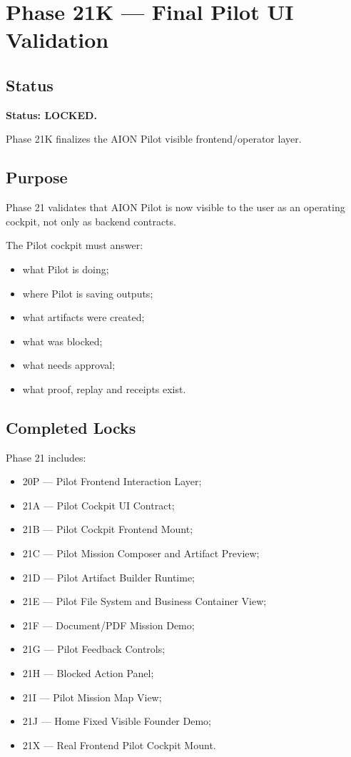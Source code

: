 \section{Phase 21K --- Final Pilot UI Validation}
\label{sec:aion-phase21k-final-pilot-ui-validation}

\subsection{Status}

\textbf{Status: LOCKED.}

Phase 21K finalizes the AION Pilot visible frontend/operator layer.

\subsection{Purpose}

Phase 21 validates that AION Pilot is now visible to the user as an operating cockpit, not only as backend contracts.

The Pilot cockpit must answer:

\begin{itemize}
  \item what Pilot is doing;
  \item where Pilot is saving outputs;
  \item what artifacts were created;
  \item what was blocked;
  \item what needs approval;
  \item what proof, replay and receipts exist.
\end{itemize}

\subsection{Completed Locks}

Phase 21 includes:

\begin{itemize}
  \item 20P --- Pilot Frontend Interaction Layer;
  \item 21A --- Pilot Cockpit UI Contract;
  \item 21B --- Pilot Cockpit Frontend Mount;
  \item 21C --- Pilot Mission Composer and Artifact Preview;
  \item 21D --- Pilot Artifact Builder Runtime;
  \item 21E --- Pilot File System and Business Container View;
  \item 21F --- Document/PDF Mission Demo;
  \item 21G --- Pilot Feedback Controls;
  \item 21H --- Blocked Action Panel;
  \item 21I --- Pilot Mission Map View;
  \item 21J --- Home Fixed Visible Founder Demo;
  \item 21X --- Real Frontend Pilot Cockpit Mount.
\end{itemize}

